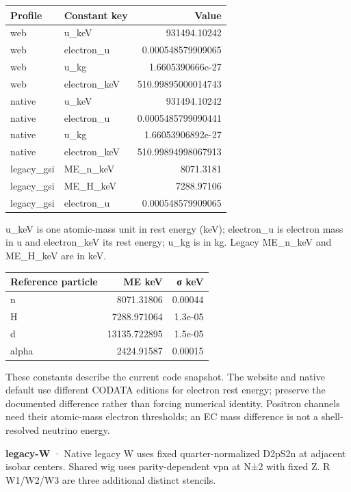 \documentclass[
  11pt,
  letterpaper,
]{article}
\begin{document}
\begin{longtable}[]{@{}llr@{}}
\toprule\noalign{}
Profile & Constant key & Value \\
\midrule\noalign{}
\endhead
\bottomrule\noalign{}
\endlastfoot
web & u\_keV & 931494.10242 \\
web & electron\_u & 0.000548579909065 \\
web & u\_kg & 1.6605390666e-27 \\
web & electron\_keV & 510.99895000014743 \\
native & u\_keV & 931494.10242 \\
native & electron\_u & 0.0005485799090441 \\
native & u\_kg & 1.66053906892e-27 \\
native & electron\_keV & 510.99894998067913 \\
legacy\_gsi & ME\_n\_keV & 8071.3181 \\
legacy\_gsi & ME\_H\_keV & 7288.97106 \\
legacy\_gsi & electron\_u & 0.000548579909065 \\
\end{longtable}

u\_keV is one atomic-mass unit in rest energy (keV); electron\_u is
electron mass in u and electron\_keV its rest energy; u\_kg is in kg.
Legacy ME\_n\_keV and ME\_H\_keV are in keV.

\begin{longtable}[]{@{}lrr@{}}
\toprule\noalign{}
Reference particle & ME keV & σ keV \\
\midrule\noalign{}
\endhead
\bottomrule\noalign{}
\endlastfoot
n & 8071.31806 & 0.00044 \\
H & 7288.971064 & 1.3e-05 \\
d & 13135.722895 & 1.5e-05 \\
alpha & 2424.91587 & 0.00015 \\
\end{longtable}

These constants describe the current code snapshot. The website and
native default use different CODATA editions for electron rest energy;
preserve the documented difference rather than forcing numerical
identity. Positron channels need their atomic-mass electron thresholds;
an EC mass difference is not a shell-resolved neutrino energy.

\textbf{legacy-W} · Native legacy W uses fixed quarter-normalized D2pS2n
at adjacent isobar centers. Shared wig uses parity-dependent vpn at N±2
with fixed Z. R W1/W2/W3 are three additional distinct stencils.
\end{document}
